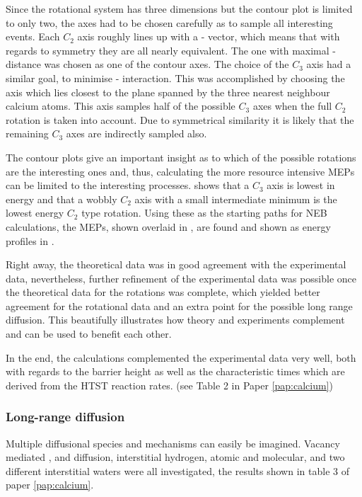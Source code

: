 Since the rotational system has three dimensions but the contour plot is limited to only two, the axes had to be chosen carefully as to sample all interesting events.
Each $C_2$ axis roughly lines up with a - vector, which means that with regards to symmetry they are all nearly equivalent.
The one with maximal - distance was chosen as one of the contour axes.
The choice of the $C_3$ axis had a similar goal, to minimise - interaction.
This was accomplished by choosing the axis which lies closest to the plane spanned by the three nearest neighbour calcium atoms.
This axis samples half of the possible $C_3$ axes when the full $C_2$ rotation is taken into account.
Due to symmetrical similarity it is likely that the remaining $C_3$ axes are indirectly sampled also.

The contour plots give an important insight as to which of the possible rotations are the interesting ones and, thus, calculating the more resource intensive MEPs can be limited to the interesting processes.
 shows that a $C_3$ axis is lowest in energy and that a wobbly $C_2$ axis with a small intermediate minimum is the lowest energy $C_2$ type rotation.
Using these as the starting paths for NEB calculations, the MEPs, shown overlaid in , are found and shown as energy profiles in .

Right away, the theoretical data was in good agreement with the experimental data, nevertheless, further refinement of the experimental data was possible once the theoretical data for the rotations was complete, which yielded better agreement for the rotational data and an extra point for the possible long range diffusion.
This beautifully illustrates how theory and experiments complement and can be used to benefit each other.

In the end, the calculations complemented the experimental data very well, both with regards to the barrier height as well as the characteristic times which are derived from the HTST reaction rates. (see Table 2 in Paper \ref{pap:calcium})

\subsubsection{Long-range diffusion}
Multiple diffusional species and mechanisms can easily be imagined.
Vacancy mediated ,   and  diffusion, interstitial hydrogen, atomic and molecular, and two different interstitial waters were all investigated, the results shown in table 3 of paper \ref{pap:calcium}.

